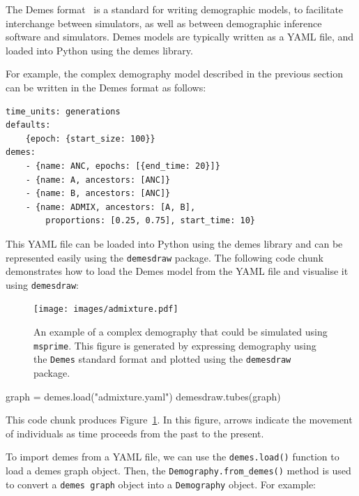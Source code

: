 \documentclass[graybox]{svmult}
\newcommand{\msprime}[0]{\texttt{msprime}}
\begin{document}
The Demes format~\citep{gower2022demes} is a standard for writing
demographic models, to facilitate interchange between simulators, as well as between
demographic inference software and simulators. Demes models are typically written as a
YAML file, and loaded into Python using the demes library.

For example, the complex demography model described in the previous section can be
written in the Demes format as follows:

\begin{footnotesize}
\begin{verbatim}
time_units: generations
defaults:
    {epoch: {start_size: 100}}
demes:
    - {name: ANC, epochs: [{end_time: 20}]}
    - {name: A, ancestors: [ANC]}
    - {name: B, ancestors: [ANC]}
    - {name: ADMIX, ancestors: [A, B],
        proportions: [0.25, 0.75], start_time: 10}
\end{verbatim}
\end{footnotesize}

This YAML file can be loaded into Python using the demes library and can be represented
easily using the \texttt{demesdraw} package. The following code chunk demonstrates how to
load the Demes model from the YAML file and visualise it using \texttt{demesdraw}:

\begin{figure}[t]
\centering
\texttt{[image: images/admixture.pdf]}
\caption{\label{fig:complex-demography}An example of a complex demography that could be
simulated using \msprime. This figure is generated by expressing demography using the
\texttt{Demes} standard format and plotted using the \texttt{demesdraw} package.}
\end{figure}

\begin{pythoncode}
graph = demes.load("admixture.yaml")
demesdraw.tubes(graph)
\end{pythoncode}
This code chunk produces Figure~\ref{fig:complex-demography}. In this figure, arrows indicate
the movement of individuals as time proceeds from the past to the present.

To import demes from a YAML file, we can use the \texttt{demes.load()} function to
load a demes graph object. Then, the \texttt{Demography.from\_demes()} method is used to convert a
\texttt{demes graph} object into a \texttt{Demography} object.
For example:
\end{document}
